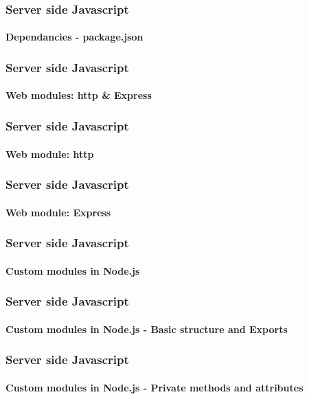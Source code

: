 \documentclass{beamer}
\begin{document}
	\begin{frame}
		\frametitle{Server side Javascript}
		\framesubtitle{Dependancies - package.json}
	\end{frame}
	\begin{frame}
		\frametitle{Server side Javascript}
		\framesubtitle{Web modules: http \& Express}
	\end{frame}
	\begin{frame}
		\frametitle{Server side Javascript}
		\framesubtitle{Web module: http}
	\end{frame}
	\begin{frame}
		\frametitle{Server side Javascript}
		\framesubtitle{Web module: Express}
	\end{frame}
	\begin{frame}
		\frametitle{Server side Javascript}
		\framesubtitle{Custom modules in Node.js}
	\end{frame}
	\begin{frame}
		\frametitle{Server side Javascript}
		\framesubtitle{Custom modules in Node.js - Basic structure and Exports}
	\end{frame}
	\begin{frame}
		\frametitle{Server side Javascript}
		\framesubtitle{Custom modules in Node.js - Private methods and attributes}
	\end{frame}
\end{document}
